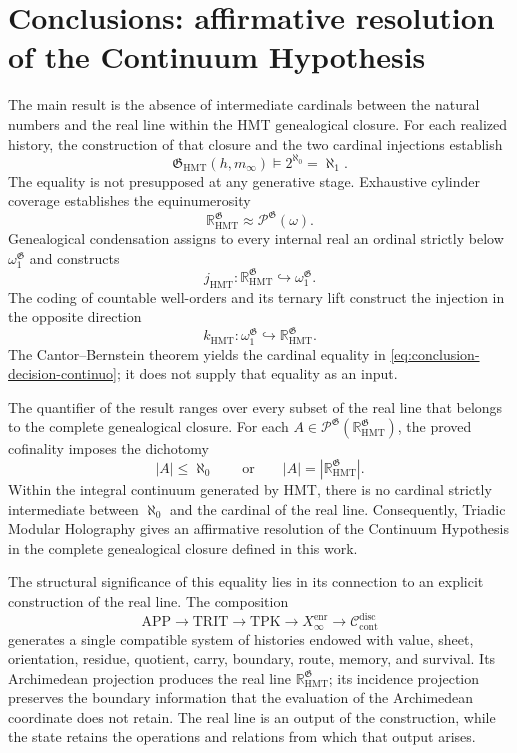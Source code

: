 \section{Conclusions: affirmative resolution of the Continuum Hypothesis}
\label{sec:conclusiones-ch}
\begingroup
\fontsize{10.5}{13.4}\selectfont
\setlength{\parskip}{3pt}
\setlength{\abovedisplayskip}{5pt}
\setlength{\belowdisplayskip}{5pt}

The main result is the absence of intermediate cardinals between the natural
numbers and the real line within the HMT genealogical closure. For each
realized history, the construction of that closure and the two cardinal
injections establish
\begin{equation}
 \boxed{
 \mathfrak G_{\mathrm{HMT}}(h,m_\infty)
 \models 2^{\aleph_0}=\aleph_1 .}
 \label{eq:conclusion-decision-continuo}
\end{equation}
The equality is not presupposed at any generative stage. Exhaustive cylinder
coverage establishes the equinumerosity
\[
 \mathbb R_{\mathrm{HMT}}^{\mathfrak G}
 \approx\mathcal P^{\mathfrak G}(\omega).
\]
Genealogical condensation assigns to every internal real an ordinal strictly
below \(\omega_1^{\mathfrak G}\) and constructs
\[
 j_{\mathrm{HMT}}:
 \mathbb R_{\mathrm{HMT}}^{\mathfrak G}\hookrightarrow
 \omega_1^{\mathfrak G}.
\]
The coding of countable well-orders and its ternary lift construct the
injection in the opposite direction
\[
 k_{\mathrm{HMT}}:
 \omega_1^{\mathfrak G}\hookrightarrow
 \mathbb R_{\mathrm{HMT}}^{\mathfrak G}.
\]
The Cantor--Bernstein theorem yields the cardinal equality in
\eqref{eq:conclusion-decision-continuo}; it does not supply that equality as
an input.

The quantifier of the result ranges over every subset of the real line that
belongs to the complete genealogical closure. For each
\(A\in\mathcal P^{\mathfrak G}
(\mathbb R_{\mathrm{HMT}}^{\mathfrak G})\), the proved cofinality imposes the
dichotomy
\[
 |A|\leq\aleph_0
 \qquad\text{or}\qquad
 |A|=|\mathbb R_{\mathrm{HMT}}^{\mathfrak G}|.
\]
Within the integral continuum generated by HMT, there is no cardinal strictly
intermediate between \(\aleph_0\) and the cardinal of the real line.
Consequently, Triadic Modular Holography gives an affirmative resolution of
the Continuum Hypothesis in the complete genealogical closure defined in this
work.

The structural significance of this equality lies in its connection to an
explicit construction of the real line. The composition
\[
 \mathrm{APP}\longrightarrow\mathrm{TRIT}\longrightarrow\mathrm{TPK}
 \longrightarrow X_\infty^{\mathrm{enr}}
 \longrightarrow\mathcal C_{\mathrm{cont}}^{\mathrm{disc}}
\]
generates a single compatible system of histories endowed with value, sheet,
orientation, residue, quotient, carry, boundary, route, memory, and survival.
Its Archimedean projection produces the real line
\(\mathbb R_{\mathrm{HMT}}^{\mathfrak G}\); its incidence projection preserves
the boundary information that the evaluation of the Archimedean coordinate does not retain. The
real line is an output of the construction, while the state retains the
operations and relations from which that output arises.

